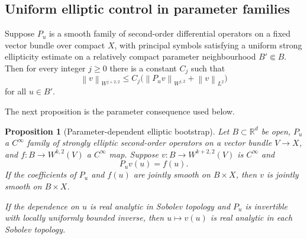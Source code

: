 \documentclass[11pt,reqno]{amsart}
\newtheorem{proposition}[theorem]{Proposition}
\theoremstyle{definition}
\theoremstyle{remark}
\newcommand{\R}{\mathbb R}
\newcommand{\norm}[1]{\left\lVert #1\right\rVert}
\begin{document}
\subsection{Uniform elliptic control in parameter families}

Suppose $P_u$ is a smooth family of second-order differential operators on a fixed vector bundle over compact $X$, with principal symbols satisfying a uniform strong ellipticity estimate on a relatively compact parameter neighbourhood $B'\Subset B$.  Then for every integer $j\ge0$ there is a constant $C_j$ such that
\begin{equation}\label{eq:uniform-elliptic-estimate}
  \norm{v}_{W^{j+2,2}}
  \le C_j\bigl(\norm{P_uv}_{W^{j,2}}+\norm{v}_{L^2}\bigr)
\end{equation}
for all $u\in B'$.

The next proposition is the parameter consequence used below.

\begin{proposition}[Parameter-dependent elliptic bootstrap]\label{prop:parametric-bootstrap}
Let $B\subset\R^d$ be open, $P_u$ a $C^\infty$ family of strongly elliptic second-order operators on a vector bundle $V\to X$, and $f:B\to W^{k,2}(V)$ a $C^\infty$ map.  Suppose $v:B\to W^{k+2,2}(V)$ is $C^\infty$ and
\[
  P_uv(u)=f(u).
\]
If the coefficients of $P_u$ and $f(u)$ are jointly smooth on $B\times X$, then $v$ is jointly smooth on $B\times X$.

If the dependence on $u$ is real analytic in Sobolev topology and $P_u$ is invertible with locally uniformly bounded inverse, then $u\mapsto v(u)$ is real analytic in each Sobolev topology.
\end{proposition}
\end{document}
